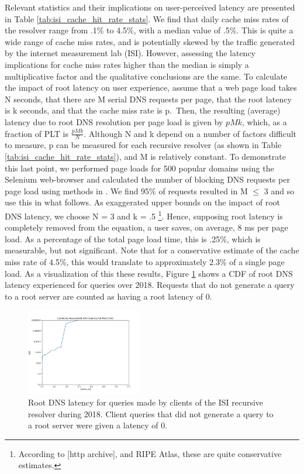 \documentclass[sigconf,nonacm,10pt]{acmart}
\begin{document}
Relevant statistics and their implications on user-perceived latency are
presented in Table \ref{tab:isi_cache_hit_rate_stats}. We find that
daily cache miss rates of the resolver range from .1\% to 4.5\%, with a
median value of .5\%. This is quite a wide range of cache miss rates,
and is potentially skewed by the traffic generated by the internet
measurement lab (ISI). However, assessing the latency implications for
cache miss rates higher than the median is simply a multiplicative
factor and the qualitative conclusions are the same. \break \break
To calculate the impact of root latency on user experience, assume that
a web page load takes N seconds, that there are M serial DNS requests
per page, that the root latency is k seconds, and that the cache miss
rate is p.~Then, the resulting (average) latency due to root DNS
resolution per page load is given by \(pMk\), which, as a fraction of
PLT is \(\frac{p M k}{N}\). \break \break
Although N and k depend on a number of factors difficult to measure, p
can be measured for each recursive resolver (as shown in Table
\ref{tab:isi_cache_hit_rate_stats}), and M is relatively constant. To
demonstrate this last point, we performed page loads for 500 popular
domains using the Selenium web-browser and calculated the number of
blocking DNS requests per page load using methods in
\cite{sundaresan2013web}. We find 95\% of requests resulted in M
\(\leq\) 3 and so use this in what follows. \break
As exaggerated upper bounds on the impact of root DNS latency, we choose
N = 3 and k = .5
\footnote{ According to [http archive], and RIPE Atlas, these are quite conservative estimates. }.
Hence, supposing root latency is completely removed from the equation, a
user saves, on average, 8 ms per page load. As a percentage of the total
page load time, this is .25\%, which is measurable, but not significant.
Note that for a conservative estimate of the cache miss rate of 4.5\%,
this would translate to approximately 2.3\% of a single page load.
\break \break
As a visualization of this these results, Figure
\ref{fig:isi_root_dns_latency} shows a CDF of root DNS latency
experienced for queries over 2018. Requests that do not generate a query
to a root server are counted as having a root latency of 0.

\begin{figure}
    \centering
    \includegraphics[width=0.45\textwidth]{figures/isi_root_dns_latency.png}
    \caption{Root DNS latency for queries made by clients of the ISI recursive resolver during 2018. Client queries that did not generate a query to a root server were given a latency of 0. }
    \label{fig:isi_root_dns_latency}
\end{figure}
\end{document}
